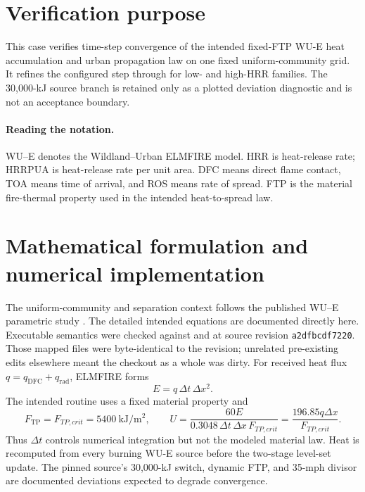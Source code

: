 \section{Verification purpose}
This case verifies time-step convergence of the intended fixed-FTP WU-E heat accumulation and urban propagation law on one fixed uniform-community grid. It refines the configured step through \TimeStepSet{} for low- and high-HRR families. The 30,000-kJ source branch is retained only as a plotted deviation diagnostic and is not an acceptance boundary.


\paragraph{Reading the notation.}
WU--E denotes the Wildland--Urban ELMFIRE model. HRR is heat-release rate;
HRRPUA is heat-release rate per unit area. DFC means direct flame contact,
TOA means time of arrival, and ROS means rate of spread. FTP is the material
fire-thermal property used in the intended heat-to-spread law.

\ReportOverview

\section{Mathematical formulation and numerical implementation}
The uniform-community and separation context follows the published WU--E
parametric study \cite{PurnomoIJWF2024}. The detailed intended equations are
documented directly here.
Executable semantics were checked against 
and  at source revision
\texttt{a2dfbcdf7220}.  Those mapped files were byte-identical to the revision;
unrelated pre-existing edits elsewhere meant the checkout as a whole was dirty.
For received heat flux $q=q_{\mathrm{DFC}}+q_{\mathrm{rad}}$, ELMFIRE forms
\begin{equation}
 E=q\,\Delta t\,\Delta x^2.
\end{equation}
The intended routine uses a fixed material property and
\begin{equation}
 F_{\mathrm{TP}}=F_{TP,crit}=5400~\si{\kilo\joule\per\square\metre},\qquad
 U=\frac{60E}{0.3048\,\Delta t\,\Delta x\,F_{TP,crit}}
  =\frac{196.85q\Delta x}{F_{TP,crit}}.
\end{equation}
Thus $\Delta t$ controls numerical integration but not the modeled material
law. Heat is recomputed from every burning WU-E source before the two-stage
level-set update. The pinned source's 30,000-kJ switch, dynamic FTP, and
35-mph divisor are documented deviations expected to degrade convergence.

